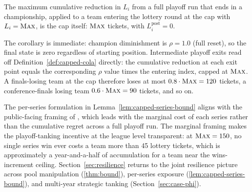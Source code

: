 \begin{corollary}
\label{cor:capped-cumulative}
The maximum cumulative reduction in $L_i$ from a full playoff run that ends in a championship, applied to a team entering the lottery round at the cap with $L_i = \textup{\textsc{Max}}$, is the cap itself: $\textup{\textsc{Max}}$ tickets, with $L_i^{\text{post}} = 0$.
\end{corollary}

The corollary is immediate: champion diminishment is $\rho = 1.0$ (full reset), so the final state is zero regardless of starting position. Intermediate playoff exits read off Definition~\ref{def:capped-cola} directly: the cumulative reduction at each exit point equals the corresponding $\rho$ value times the entering index, capped at $\textup{\textsc{Max}}$. A finals-losing team at the cap therefore loses at most $0.8 \cdot \textup{\textsc{Max}} = 120$ tickets, a conference-finals losing team $0.6 \cdot \textup{\textsc{Max}} = 90$ tickets, and so on.

The per-series formulation in Lemma~\ref{lem:capped-series-bound} aligns with the public-facing framing of \citet{highley2026solvable5}, which leads with the marginal cost of each series rather than the cumulative regret across a full playoff run. The marginal framing makes the playoff-tanking incentive at the league level transparent: at $\textup{\textsc{Max}} = 150$, no single series win ever costs a team more than 45 lottery tickets, which is approximately a year-and-a-half of accumulation for a team near the wins-increment ceiling. Section~\ref{sec:resilience} returns to the joint resilience picture across pool manipulation (\cref{thm:bound}), per-series exposure (\cref{lem:capped-series-bound}), and multi-year strategic tanking (Section~\ref{sec:case-phi}).
